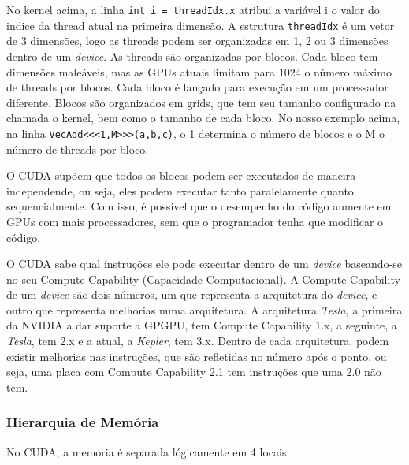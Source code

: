 No kernel acima, a linha \verb#int i = threadIdx.x# atribui a variável i o valor do indice da thread atual na primeira dimensão. 
A estrutura \verb#threadIdx# é um vetor de 3 dimensões, logo as threads podem ser organizadas em 1, 2 ou 3 dimensões dentro de um
\textit{device}. As threads são organizadas por blocos. Cada bloco tem dimensões maleáveis, mas as GPUs atuais limitam para 1024 o 
número máximo de threads por blocos. Cada bloco é lançado para execução em um processador diferente. Blocos são organizados em 
grids, que tem seu tamanho configurado na chamada o kernel, bem como o tamanho de cada bloco. No nosso exemplo acima, na linha
\verb#VecAdd<<<1,M>>>(a,b,c)#, o 1 determina o número de blocos e o M o número de threads por bloco.

O CUDA supõem que todos os blocos podem ser executados de maneira independende, ou seja, eles podem executar tanto paralelamente
quanto sequencialmente. Com isso, é possivel que o desempenho do código aumente em GPUs com mais processadores, sem que o programador
tenha que modificar o código.

O CUDA sabe qual instruções ele pode executar dentro de um \textit{device} baseando-se no seu Compute Capability 
(Capacidade Computacional). A Compute Capability de um \textit{device} são dois números, um que representa a arquitetura do 
\textit{device}, e outro que representa melhorias numa arquitetura.
A arquitetura \textit{Tesla}, a primeira da NVIDIA a dar suporte a GPGPU, tem Compute Capability 1.x, a seguinte, a \textit{Tesla},
tem 2.x e a atual, a \textit{Kepler}, tem 3.x. Dentro de cada arquitetura, podem existir melhorias nas instruções, que são
refletidas no número após o ponto, ou seja, uma placa com Compute Capability 2.1 tem instruções que uma 2.0 não tem.

\subsubsection{Hierarquia de Memória}
No CUDA, a memoria é separada lógicamente em 4 locais:

